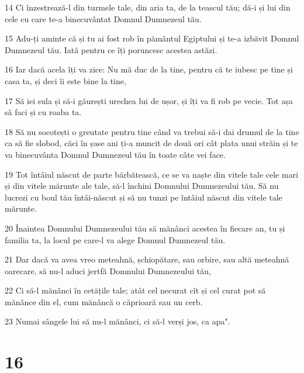 \par 14 Ci înzestrează-l din turmele tale, din aria ta, de la teascul tău; dă-i și lui din cele cu care te-a binecuvântat Domnul Dumnezeul tău.
\par 15 Adu-ți aminte că și tu ai fost rob în pământul Egiptului și te-a izbăvit Domnul Dumnezeul tău. Iată pentru ce îți poruncesc acestea astăzi.
\par 16 Iar dacă acela îți va zice: Nu mă duc de la tine, pentru că te iubesc pe tine și casa ta, și deci îi este bine la tine,
\par 17 Să iei sula și să-i găurești urechea lui de ușor, și îți va fi rob pe vecie. Tot așa să faci și cu roaba ta.
\par 18 Să nu socotești o greutate pentru tine când va trebui să-i dai drumul de la tine ca să fie slobod, căci în șase ani ți-a muncit de două ori cât plata unui străin și te va binecuvânta Domnul Dumnezeul tău în toate câte vei face.
\par 19 Tot întâiul născut de parte bărbătească, ce se va naște din vitele tale cele mari și din vitele mărunte ale tale, să-l închini Domnului Dumnezeului tău. Să nu lucrezi cu boul tău întâi-născut și să nu tunzi pe întâiul născut din vitele tale mărunte.
\par 20 Înaintea Domnului Dumnezeului tău să mănânci acestea în fiecare an, tu și familia ta, la locul pe care-l va alege Domnul Dumnezeul tău.
\par 21 Dar dacă va avea vreo meteahnă, șchiopătare, sau orbire, sau altă meteahnă oarecare, să nu-l aduci jertfă Domnului Dumnezeului tău,
\par 22 Ci să-l mănânci în cetățile tale; atât cel necurat cît și cel curat pot să mănânce din el, cum mănâncă o căprioară sau un cerb.
\par 23 Numai sângele lui să nu-l mănânci, ci să-l verși jos, ca apa".

\chapter{16}

